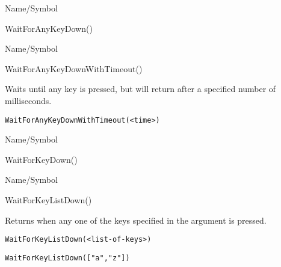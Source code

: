 \rl


\begin{desc}{Name/Symbol}
\item[Name/Symbol]  	WaitForAnyKeyDown()

\item[Description]	

\item[Usage]		

\item[Example]	

\item[See Also]	
\end{desc}

\rl


\begin{desc}{Name/Symbol}
\item[Name/Symbol]  	WaitForAnyKeyDownWithTimeout()

\item[Description]  	Waits until any key is pressed, but will return after a 
		specified number of milliseconds.

\item[Usage]
\begin{verbatim}
WaitForAnyKeyDownWithTimeout(<time>)
\end{verbatim}

\item[Example]	

\item[See Also]	
\end{desc}

\rl


\begin{desc}{Name/Symbol}
\item[Name/Symbol]  	WaitForKeyDown()

\item[Description]	

\item[Usage]		

\item[Example]	

\item[See Also]	
\end{desc}

\rl


\begin{desc}{Name/Symbol}
\item[Name/Symbol]  	WaitForKeyListDown()

\item[Description]  	Returns when any one of the keys specified in the argument is 
		pressed.

\item[Usage]
\begin{verbatim}
WaitForKeyListDown(<list-of-keys>)
\end{verbatim}

\item[Example]     	
\begin{verbatim}
WaitForKeyListDown(["a","z"])
\end{verbatim}

\item[See Also]	
 \end{desc}

